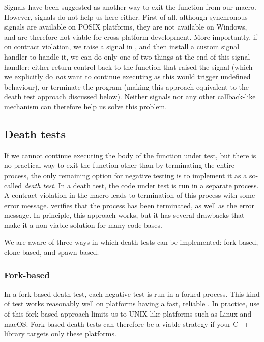 Signals have been suggested as another way to exit the function from our  macro. However, signals do not help us here either. First of all, although synchronous signals are available on POSIX platforms, they are not available on Windows, and are therefore not viable for cross-platform development. More importantly, if on contract violation, we raise a signal in , and then install a custom signal handler to handle it, we can do only one of two things at the end of this signal handler: either return control back to the function that raised the signal (which we explicitly do \emph{not} want to continue executing as this would trigger undefined behaviour), or terminate the program (making this approach equivalent to the death test approach discussed below). Neither signals nor any other callback-like mechanism can therefore help us solve this problem.

\subsection{Death tests}
\label{subsec:deathtests}

If we cannot continue executing the body of the function under test, but there is no practical way to exit the function other than by terminating the entire process, the only remaining option for negative testing is to implement it as a so-called \emph{death test}. In a death test, the code under test is run in a separate process. A contract violation in the  macro leads to termination of this process with some error message.  verifies that the process has been terminated, as well as the error message. In principle, this approach works, but it has several drawbacks that make it a non-viable solution for many code bases.

We are aware of three ways in which death tests can be implemented: fork-based, clone-based, and spawn-based.

\subsubsection{Fork-based}

In a fork-based death test, each negative test is run in a forked process. This kind of test works reasonably well on platforms having a fast, reliable . In practice, use of this fork-based approach limits us to UNIX-like platforms such as Linux and macOS. Fork-based death tests can therefore be a viable strategy if your C++ library  targets only these platforms.

